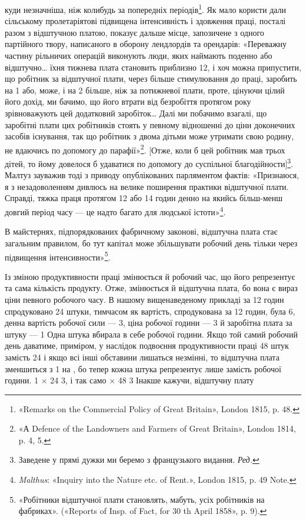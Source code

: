 \parcont{}  %
куди незначніша, ніж колибудь за попередніх періодів\footnote{
«Remarks on the Commercial Policy of Great Britain», London
1815, p. 48.
}. Як
мало користи дали сільському пролетаріятові підвищена інтенсивність
і здовження праці, посталі разом з відштучною платою,
показує дальше місце, запозичене з одного партійного твору,
написаного в оборону лендлордів та орендарів: «Переважну
частину рільничих операцій виконують люди, яких наймають
поденно або відштучно\dots{} їхня тижнева плата становить приблизно
12, і хоч можна припустити, що робітник за відштучної
плати, через більше стимулювання до праці, заробить на 1 або,
може, і на 2 більше, ніж за потижневої плати, проте,
цінуючи цілий його дохід, ми бачимо, що його втрати від безробіття
протягом року зрівноважують цей додатковий заробіток\dots{}
Далі ми побачимо взагалі, що заробітні плати цих робітників
стоять у певному відношенні до ціни доконечних засобів існування,
так що робітник з двома дітьми може утримати свою родину,
не вдаючись по допомогу до парафії»\footnote{
«А Defence of the Landowners and Farmers of Great Britain», London
1814, p. 4, 5.
}. [Отже, коли б цей
робітник мав трьох дітей, то йому довелося б удаватися по допомогу
до суспільної благодійности]\footnote*{
Заведене у прямі дужки ми беремо з французького видання. \emph{Ред.}
}. Малтуз зауважив тоді з
приводу опублікованих парляментом фактів: «Признаюся, я з
незадоволенням дивлюсь на велике поширення практики відштучної
плати. Справді, тяжка праця протягом 12 або 14 годин
денно на якийсь більш-менш довгий період часу — це надто багато
для людської істоти»\footnote{
\emph{Malthus}: «Inquiry into the Nature etc. of Rent.», London 1815,
p. 49 Note.
}.

В майстернях, підпорядкованих фабричному законові, відштучна
плата стає загальним правилом, бо тут капітал може збільшувати
робочий день тільки через підвищення інтенсивности»\footnote{
«Робітники відштучної плати становлять, мабуть,  усіх робітників
на фабриках». («Reports of Insp. of Fact, for 30 th April
1858», p. 9).
}.

Із зміною продуктивности праці змінюється й робочий час,
що його репрезентує та сама кількість продукту. Отже, змінюється
й відштучна плата, бо вона є вираз ціни певного робочого
часу. В нашому вищенаведеному прикладі за 12 годин спродуковано
24 штуки, тимчасом як вартість, спродукована за 12 годин,
була 6, денна вартість робочої сили — 3,
ціна робочої години — 3 й заробітна плата за штуку —
1 Одна штука вбирала в себе  робочої години. Якщо
той самий робочий день даватиме, приміром, у наслідок подвоєння
продуктивности праці 48 штук замість 24 і якщо всі інші
обставини лишаться незмінні, то відштучна плата зменшиться
з 1 на , бо тепер кожна штука репрезентує лише
 замість  робочої години. 1 × 24 \deq{} 3, і так
само  × 48 \deq{} 3 Інакше кажучи, відштучну плату
\parbreak{}  %
